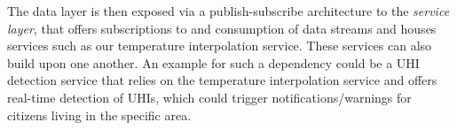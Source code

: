The data layer is then exposed via a publish-subscribe architecture \cite{bornholdt2019sane} to the \textit{service layer}, that offers subscriptions to and consumption of data streams and houses services such as our temperature interpolation service. These services can also build upon one another. An example for such a dependency could be a UHI detection service that relies on the temperature interpolation service and offers real-time detection of UHIs, which could trigger notifications/warnings for citizens living in the specific area.